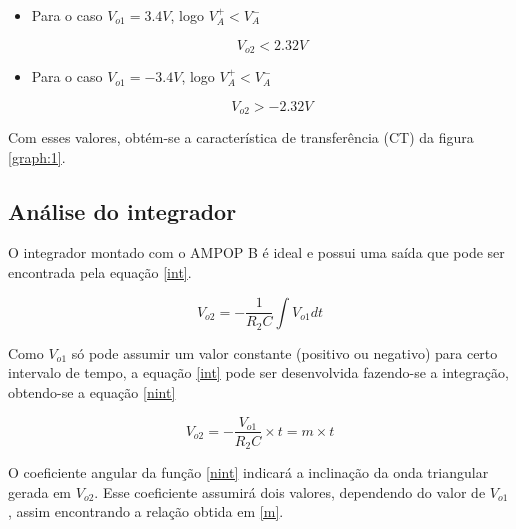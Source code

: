 \begin{itemize}
    \item Para o caso $V_{o1}=3.4 V$, logo $V_{A}^{+}<V_{A}^{-}$\\
    \begin{center}
        \begin{equation} \label{+>-}
            V_{o2} < 2.32 V
        \end{equation}
    \end{center}
    
    \item Para o caso $V_{o1}=-3.4 V$, logo $V_{A}^{+}<V_{A}^{-}$ \\ 
    
    \begin{center}
        \begin{equation} \label{+<-}
            V_{o2} > -2.32 V
        \end{equation}
    \end{center}
\end{itemize}

Com esses valores, obtém-se a característica de transferência (CT) da figura \ref{graph:1}.



\subsection{Análise do integrador}

O integrador montado com o AMPOP B é ideal e possui uma saída que pode ser encontrada pela equação \ref{int}.

\begin{equation} \label{int}
 V_{o2} = - \frac{1}{R_2 C} \int V_{o1} dt
\end{equation}

Como $V_{o1}$ só pode assumir um valor constante (positivo ou negativo) para certo intervalo de tempo, a equação \ref{int} pode ser desenvolvida fazendo-se a integração, obtendo-se a equação \ref{nint}

\begin{equation} \label{nint}
 V_{o2} = - \frac{V_{o1}}{R_2 C} \times t = m \times t
\end{equation}

O coeficiente angular da função \ref{nint} indicará a inclinação da onda triangular gerada em $V_{o2}$. Esse coeficiente assumirá dois valores, dependendo do valor de $V_{o1}$, assim encontrando a relação obtida em \ref{m}.

